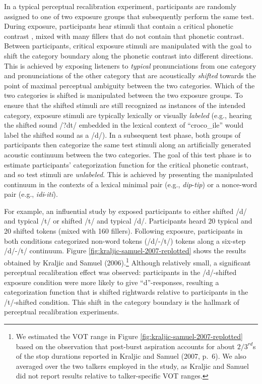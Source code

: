 \documentclass[
  11pt,
  man,floatsintext]{apa6}
\begin{document}
In a typical perceptual recalibration experiment, participants are randomly assigned to one of two exposure groups that subsequently perform the same test. During exposure, participants hear stimuli that contain a critical phonetic contrast \autocite[e.g., syllable-intial /d/ vs.~/t/, as in \emph{croco\emph{d}ile} or \emph{cafe\emph{t}eria},][]{kraljic-samuel2006}, mixed with many fillers that do not contain that phonetic contrast. Between participants, critical exposure stimuli are manipulated with the goal to shift the category boundary along the phonetic contrast into different directions. This is achieved by exposing listeners to \emph{typical} pronunciations from one category and pronunciations of the other category that are acoustically \emph{shifted} towards the point of maximal perceptual ambiguity between the two categories. Which of the two categories is shifted is manipulated between the two exposure groups. To ensure that the shifted stimuli are still recognized as instances of the intended category, exposure stimuli are typically lexically or visually \emph{labeled} (e.g., hearing the shifted sound /?dt/ embedded in the lexical context of ``croco\_ile'' would label the shifted sound as a /d/). In a subsequent test phase, both groups of participants then categorize the same test stimuli along an artificially generated acoustic continuum between the two categories. The goal of this test phase is to estimate participants' categorization function for the critical phonetic contrast, and so test stimuli are \emph{unlabeled}. This is achieved by presenting the manipulated continuum in the contexts of a lexical minimal pair (e.g., \emph{dip}-\emph{tip}) or a nonce-word pair (e.g., \emph{idi}-\emph{iti}).

For example, an influential study by \textcite{kraljic-samuel2006} exposed participants to either shifted /d/ and typical /t/ or shifted /t/ and typical /d/. Participants heard 20 typical and 20 shifted tokens (mixed with 160 fillers). Following exposure, participants in both conditions categorized non-word tokens (/d/-/t/) tokens along a six-step /d/-/t/ continuum. Figure \ref{fig:kraljic-samuel-2007-replotted} shows the results obtained by Kraljic and Samuel (2006).\footnote{We estimated the VOT range in Figure \ref{fig:kraljic-samuel-2007-replotted} based on the observation that post-burst aspiration accounts for about \(2/3^{rd}\)s of the stop durations reported in Kraljic and Samuel (2007, p.~6). We also averaged over the two talkers employed in the study, as Kraljic and Samuel did not report results relative to talker-specific VOT ranges.} Although relatively small, a significant perceptual recalibration effect was observed: participants in the /d/-shifted exposure condition were more likely to give ``d''-responses, resulting a categorization function that is shifted rightwards relative to participants in the /t/-shifted condition. This shift in the category boundary is the hallmark of perceptual recalibration experiments.
\end{document}
